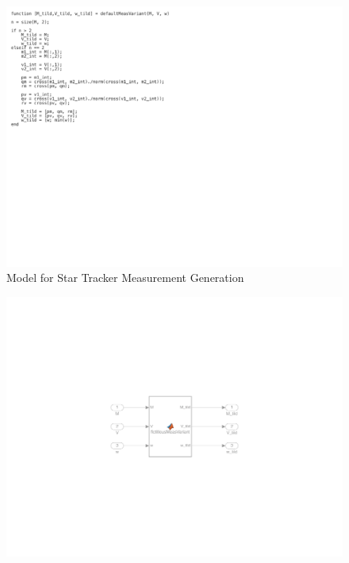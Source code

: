 \begin{figure}[H]
    \centering
    \captionsetup{ justification = centering }
    \includegraphics[trim={0cm 10cm 10cm 0cm},clip,width = 15cm]{Images/PS6/feedthrough_meas_code.png}
    \caption{Model for Star Tracker Measurement Generation}
    \label{fig:feedthrough_meas}
\end{figure}

\begin{figure}[H]
    \centering
    \captionsetup{ justification = centering }
    \includegraphics[trim={8cm 8cm 8cm 8cm},clip,width = 12cm]{Images/PS6/fict_meas.png}
\end{figure}

